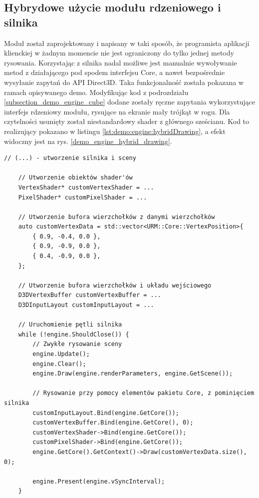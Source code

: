 \subsection{Hybrydowe użycie modułu rdzeniowego i silnika}
Moduł został zaprojektowany i napisany w taki sposób, że programista aplikacji klienckiej w żadnym momencie nie jest ograniczony do tylko jednej metody rysowania. Korzystając z silnika nadal możliwe jest manualnie wywoływanie metod z działającego pod spodem interfejsu Core, a nawet bezpośrednie wysyłanie zapytań do API Direct3D. Taka funkcjonalność została pokazana w ramach opisywanego demo. Modyfikując kod z podrozdziału \ref{subsection_demo_engine_cube} dodane zostały ręczne zapytania wykorzystujące interfejs rdzeniowy modułu, rysujące na ekranie mały trójkąt w rogu. Dla czytelności usunięty został niestandardowy shader z głównego sześcianu. Kod to realizujący pokazano w listingu \ref{lst:demo:engine:hybridDrawing}, a efekt widoczny jest na rys. \ref{demo_engine_hybrid_drawing}.

\vfill

\begin{lstlisting}[caption={Fragmentu kodu dema, który pokazuje możliwość hybrydowego użycia interfejsów różnych warstw modułu.}, label={lst:demo:engine:hybridDrawing}]
	// (...) - utworzenie silnika i sceny
	
	// Utworzenie obiektów shader'ów
	VertexShader* customVertexShader = ...
	PixelShader* customPixelShader = ...
	
	// Utworzenie bufora wierzchołków z danymi wierzchołków
	auto customVertexData = std::vector<URM::Core::VertexPosition>{
		{ 0.9, -0.4, 0.0 },
		{ 0.9, -0.9, 0.0 },
		{ 0.4, -0.9, 0.0 },
	};
	
	// Utworzenie bufora wierzchołków i układu wejściowego
	D3DVertexBuffer customVertexBuffer = ...
	D3DInputLayout customInputLayout = ...
	
	// Uruchomienie pętli silnika
	while (!engine.ShouldClose()) {
		// Zwykłe rysowanie sceny
		engine.Update();
		engine.Clear();
		engine.Draw(engine.renderParameters, engine.GetScene());
		
		// Rysowanie przy pomocy elementów pakietu Core, z pominięciem silnika
		customInputLayout.Bind(engine.GetCore());
		customVertexBuffer.Bind(engine.GetCore(), 0);
		customVertexShader->Bind(engine.GetCore());
		customPixelShader->Bind(engine.GetCore());
		engine.GetCore().GetContext()->Draw(customVertexData.size(), 0);
		
		engine.Present(engine.vSyncInterval);
	}
\end{lstlisting}

